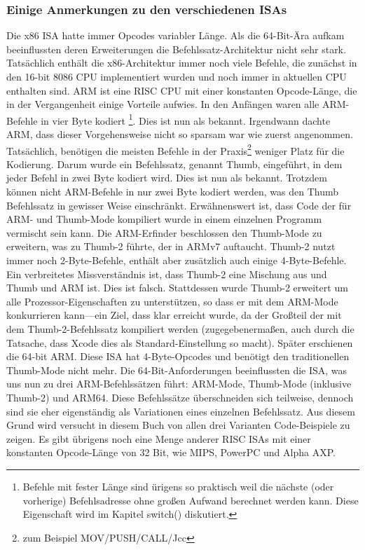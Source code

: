 %
%
%

\subsubsection{Einige Anmerkungen zu den verschiedenen \ac{ISA}s}
Die x86 \ac{ISA} hatte immer Opcodes variabler Länge. Als die 64-Bit-Ära aufkam beeinflussten deren Erweiterungen die Befehlssatz-Architektur
nicht sehr stark. Tatsächlich enthält die x86-Architektur immer noch viele Befehle, die zunächst in den 16-bit 8086 CPU implementiert
wurden und noch immer in aktuellen CPU enthalten sind.
ARM ist eine \ac{RISC} \ac{CPU} mit einer konstanten Opcode-Länge, die in der Vergangenheit einige Vorteile aufwies.
In den Anfängen waren alle ARM-Befehle in vier Byte kodiert%
\footnote{
Befehle mit fester Länge sind ürigens so praktisch weil die nächste (oder vorherige) 
Befehlsadresse ohne großen Aufwand berechnet werden kann. Diese Eigenschaft wird im Kapitel switch() diskutiert.}.
Dies ist nun als  bekannt.
Irgendwann dachte ARM, dass dieser Vorgehensweise nicht so sparsam war wie zuerst angenommen.
Tatsächlich, benötigen die meisten Befehle in der Praxis\footnote{zum Beispiel MOV/PUSH/CALL/Jcc} weniger Platz für die Kodierung.
Darum wurde ein Befehlssatz, genannt Thumb, eingeführt, in dem jeder Befehl in zwei Byte kodiert wird.
Dies ist nun als  bekannt.
Trotzdem können nicht  ARM-Befehle in nur zwei Byte kodiert werden, was den Thumb Befehlssatz in gewisser Weise einschränkt.
Erwähnenswert ist, dass Code der für ARM- und Thumb-Mode kompiliert wurde in einem einzelnen Programm vermischt sein kann.
Die ARM-Erfinder beschlossen den Thumb-Mode zu erweitern, was zu Thumb-2 führte, der in ARMv7 auftaucht.
Thumb-2 nutzt immer noch 2-Byte-Befehle, enthält aber zusätzlich auch einige 4-Byte-Befehle.
Ein verbreitetes Missverständnis ist, dass Thumb-2 eine Mischung aus und Thumb und ARM ist. Dies ist falsch.
Stattdessen wurde Thumb-2 erweitert um alle Prozessor-Eigenschaften zu unterstützen, so dass er mit dem ARM-Mode konkurrieren kann---ein
Ziel, dass klar erreicht wurde, da der Großteil der \idevices mit dem Thumb-2-Befehlssatz kompiliert werden (zugegebenermaßen, auch durch
die Tatsache, dass Xcode dies als Standard-Einstellung so macht).
Später erschienen die 64-bit ARM. Diese \ac{ISA} hat 4-Byte-Opcodes und benötigt den traditionellen Thumb-Mode nicht mehr.
Die 64-Bit-Anforderungen beeinflussten die \ac{ISA}, was uns nun zu drei ARM-Befehlssätzen führt: ARM-Mode, Thumb-Mode (inklusive Thumb-2) und ARM64.
Diese Befehlssätze überschneiden sich teilweise, dennoch sind sie eher eigenständig als Variationen eines einzelnen Befehlssatz.
Aus diesem Grund wird versucht in diesem Buch von allen drei Varianten Code-Beispiele zu zeigen.
%
%
%
Es gibt übrigens noch eine Menge anderer \ac{RISC} \ac{ISA}s mit einer konstanten Opcode-Länge von 32 Bit, wie MIPS, PowerPC und Alpha AXP.
